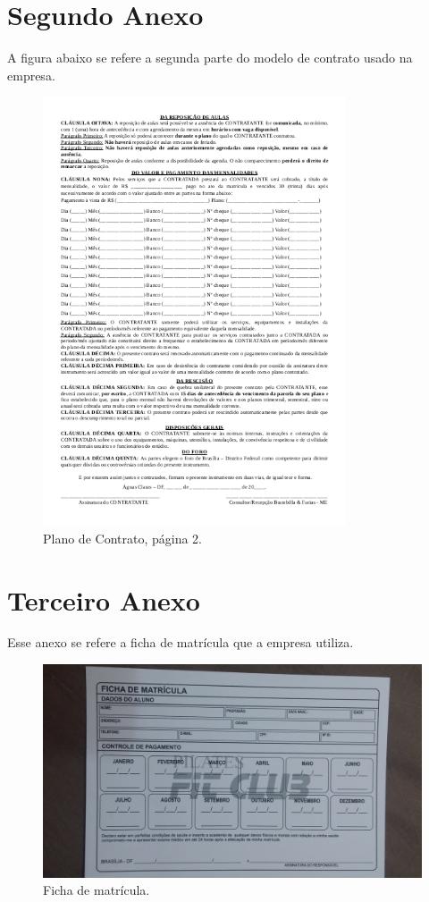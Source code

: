 \begin{anexosenv}
\chapter{Segundo Anexo}
A figura abaixo se refere a segunda parte do modelo de contrato usado na empresa.
\begin{figure}[h!]
    \centering
    \includegraphics[width=0.8\textwidth]{figuras/contrato_2.png}
    \caption{Plano de Contrato, página 2.}
    \label{fig:contrato_2}
\end{figure}
\chapter{Terceiro Anexo}
Esse anexo se refere a ficha de matrícula que a empresa utiliza.
\begin{figure}[h!]
    \centering
    \includegraphics[width=\textwidth, angle=180]{figuras/matricula.jpg}
    \caption{Ficha de matrícula.}
    \label{fig:matricula}
\end{figure}

\end{anexosenv}
